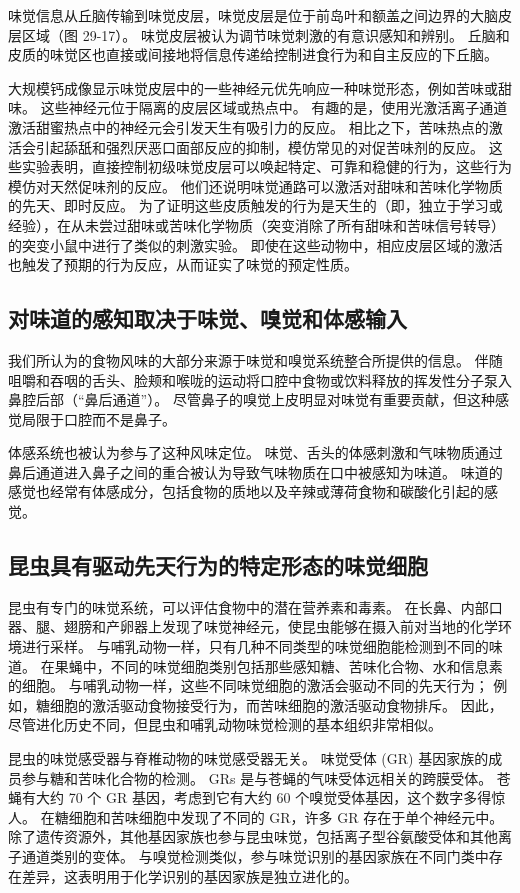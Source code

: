 味觉信息从丘脑传输到味觉皮层，味觉皮层是位于前岛叶和额盖之间边界的大脑皮层区域（图 29-17）。 味觉皮层被认为调节味觉刺激的有意识感知和辨别。 丘脑和皮质的味觉区也直接或间接地将信息传递给控制进食行为和自主反应的下丘脑。

大规模钙成像显示味觉皮层中的一些神经元优先响应一种味觉形态，例如苦味或甜味。 这些神经元位于隔离的皮层区域或热点中。 有趣的是，使用光激活离子通道激活甜蜜热点中的神经元会引发天生有吸引力的反应。 相比之下，苦味热点的激活会引起舔舐和强烈厌恶口面部反应的抑制，模仿常见的对促苦味剂的反应。 这些实验表明，直接控制初级味觉皮层可以唤起特定、可靠和稳健的行为，这些行为模仿对天然促味剂的反应。 他们还说明味觉通路可以激活对甜味和苦味化学物质的先天、即时反应。 为了证明这些皮质触发的行为是天生的（即，独立于学习或经验），在从未尝过甜味或苦味化学物质（突变消除了所有甜味和苦味信号转导）的突变小鼠中进行了类似的刺激实验。 即使在这些动物中，相应皮层区域的激活也触发了预期的行为反应，从而证实了味觉的预定性质。

\subsection{对味道的感知取决于味觉、嗅觉和体感输入}

我们所认为的食物风味的大部分来源于味觉和嗅觉系统整合所提供的信息。 伴随咀嚼和吞咽的舌头、脸颊和喉咙的运动将口腔中食物或饮料释放的挥发性分子泵入鼻腔后部（“鼻后通道”）。 尽管鼻子的嗅觉上皮明显对味觉有重要贡献，但这种感觉局限于口腔而不是鼻子。

体感系统也被认为参与了这种风味定位。 味觉、舌头的体感刺激和气味物质通过鼻后通道进入鼻子之间的重合被认为导致气味物质在口中被感知为味道。 味道的感觉也经常有体感成分，包括食物的质地以及辛辣或薄荷食物和碳酸化引起的感觉。


\subsection{昆虫具有驱动先天行为的特定形态的味觉细胞}

昆虫有专门的味觉系统，可以评估食物中的潜在营养素和毒素。 在长鼻、内部口器、腿、翅膀和产卵器上发现了味觉神经元，使昆虫能够在摄入前对当地的化学环境进行采样。 与哺乳动物一样，只有几种不同类型的味觉细胞能检测到不同的味道。 在果蝇中，不同的味觉细胞类别包括那些感知糖、苦味化合物、水和信息素的细胞。 与哺乳动物一样，这些不同味觉细胞的激活会驱动不同的先天行为； 例如，糖细胞的激活驱动食物接受行为，而苦味细胞的激活驱动食物排斥。 因此，尽管进化历史不同，但昆虫和哺乳动物味觉检测的基本组织非常相似。

昆虫的味觉感受器与脊椎动物的味觉感受器无关。 味觉受体 (GR) 基因家族的成员参与糖和苦味化合物的检测。 GRs 是与苍蝇的气味受体远相关的跨膜受体。 苍蝇有大约 70 个 GR 基因，考虑到它有大约 60 个嗅觉受体基因，这个数字多得惊人。 在糖细胞和苦味细胞中发现了不同的 GR，许多 GR 存在于单个神经元中。 除了遗传资源外，其他基因家族也参与昆虫味觉，包括离子型谷氨酸受体和其他离子通道类别的变体。 与嗅觉检测类似，参与味觉识别的基因家族在不同门类中存在差异，这表明用于化学识别的基因家族是独立进化的。

